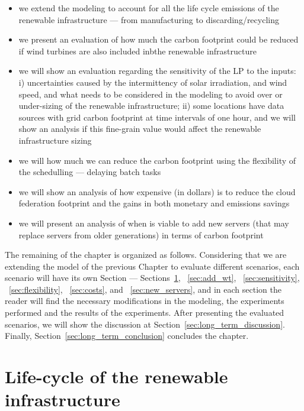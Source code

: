 \begin{itemize}
 
\item we extend the modeling to account for all the life cycle emissions of the renewable infrastructure --- from manufacturing to discarding/recycling
\item we present an evaluation of how much the carbon footprint could be reduced if wind turbines are also included inbthe renewable infrastructure 
\item we will show an evaluation regarding the sensitivity of the LP to the inputs: i) uncertainties caused by the intermittency of solar irradiation, and wind speed, and what needs to be considered in the modeling to avoid over or under-sizing of the renewable infrastructure; ii) some locations have data sources with grid carbon footprint at time intervals of one hour, and we will show an analysis if this fine-grain value would affect the renewable infrastructure sizing
\item we will how much we can reduce the carbon footprint using the flexibility of the schedulling --- delaying batch tasks
\item we will show an analysis of how expensive (in dollars) is to reduce the cloud federation footprint and the gains in both monetary and emissions savings
\item we will present an analysis of when is viable to add new servers (that may replace servers from older generations) in terms of carbon footprint


\end{itemize}

The remaining of the chapter is organized as follows. Considering that we are extending the model of the previous Chapter to evaluate different scenarios, each scenario will have its own Section --- Sections~\ref{sec:lifecicle}, ~\ref{sec:add_wt}, ~\ref{sec:sensitivity}, ~\ref{sec:flexibility}, ~\ref{sec:costs}, and  ~\ref{sec:new_servers}, and in each section the reader will find the necessary modifications in the modeling, the experiments performed and the results of the experiments. After presenting the evaluated scenarios, we will show the discussion at Section~\ref{sec:long_term_discussion}. Finally, Section~\ref{sec:long_term_conclusion} concludes the chapter.



\section{Life-cycle of the renewable infrastructure}
\label{sec:lifecicle}
